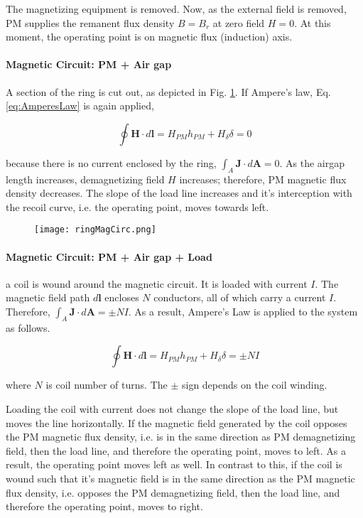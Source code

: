 The magnetizing equipment is removed. Now, as the external field is removed, PM supplies the remanent flux density $B = B_{r}$ at zero field $H=0$. At this moment, the operating point is on magnetic flux (induction) axis.

\paragraph{Magnetic Circuit: PM + Air gap}

A section of the ring is cut out, as depicted in Fig. \ref{fig:ringMagCirc}. If Ampere's law, Eq. \ref{eq:AmperesLaw} is again applied,

\begin{equation}
	\oint \textbf{H} \cdot d\textbf{l} = H_{PM}h_{PM}+H_{\delta}\delta = 0
	\label{eq:Ampereslaw_magcircapp}
\end{equation}

because there is no current enclosed by the ring, $\int_{A} \textbf{J} \cdot d\textbf{A}=0$. As the airgap length increases, demagnetizing field $H$ increases; therefore, PM magnetic flux density decreases. The slope of the load line increases and it's interception with the recoil curve, i.e. the operating point, moves towards left.
\begin{figure}[h]
    \centering
    \texttt{[image: ringMagCirc.png]}
    \label{fig:ringMagCirc}
\end{figure}

\paragraph{Magnetic Circuit: PM + Air gap + Load} a coil is wound around the magnetic circuit. It is loaded with current $I$. The magnetic field path $d\textbf{l}$ encloses $N$ conductors, all of which carry a current $I$. Therefore, $\int_{A} \textbf{J} \cdot d\textbf{A} = \pm NI$. As a result, Ampere's Law is applied to the system as follows.

\begin{equation}
	\oint \textbf{H} \cdot d\textbf{l} = H_{PM}h_{PM}+H_{\delta}\delta = \pm NI
	\label{eq:Ampereslaw_magcircapp1}
\end{equation}

where $N$ is coil number of turns. The $\pm$ sign depends on the coil winding.

Loading the coil with current does not change the slope of the load line, but moves the line horizontally. If the magnetic field generated by the coil opposes the PM magnetic flux density, i.e. is in the same direction as PM demagnetizing field, then the load line, and therefore the operating point, moves to left. As a result, the operating point moves left as well. In contrast to this, if the coil is wound such that it's magnetic field is in the same direction as the PM magnetic flux density, i.e. opposes the PM demagnetizing field, then the load line, and therefore the operating point, moves to right.

